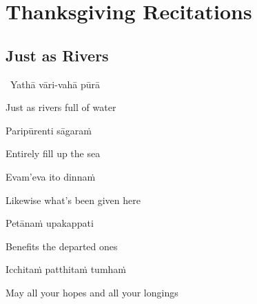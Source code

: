 \ifdesktopversion
{}
\else
{}
\fi

\chapter{Thanksgiving Recitations}

\clearpage

\section{Just as Rivers}
\label{just-as-rivers}

\begin{leader}
  \anglebracketleft\ \hspace{-0.5mm}Yathā vāri-vahā pūrā \hspace{-0.5mm}\anglebracketright\
\end{leader}

\begin{english}
  Just as rivers full of water
\end{english}

Paripūrenti sāgaraṁ

\begin{english}
  Entirely fill up the sea
\end{english}

Evam'eva ito dinnaṁ

\begin{english}
  Likewise what's been given here\makeatletter\hyperlink{endnote114-appendix}\makeatother
\end{english}

Petānaṁ upakappati

\begin{english}
  Benefits the departed ones\makeatletter\hyperlink{endnote115-appendix}\makeatother
\end{english}


Icchitaṁ patthitaṁ tumhaṁ

\begin{english}
  May all your hopes and all your longings
\end{english}

